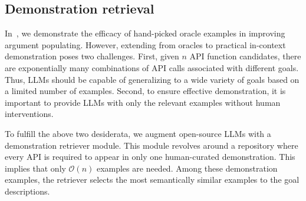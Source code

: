 

\subsection{Demonstration retrieval}
\label{subset:demo_retrieve}


In~, we demonstrate the efficacy of hand-picked oracle examples in improving argument populating. However, extending from oracles to practical in-context demonstration poses two challenges. First, given $n$ API function candidates, there are exponentially many combinations of API calls associated with different goals. Thus, LLMs should be capable of generalizing to a wide variety of goals based on a limited number of examples. Second, to ensure effective demonstration, it is important to provide LLMs with only the relevant examples without human interventions.

To fulfill the above two desiderata, we augment open-source LLMs with a demonstration retriever module. This module revolves around a repository where every API is required to appear in only one human-curated demonstration. This implies that only $\mathcal{O}(n)$ examples are needed. 
Among these demonstration examples, the retriever selects the most semantically similar examples to the goal descriptions.

